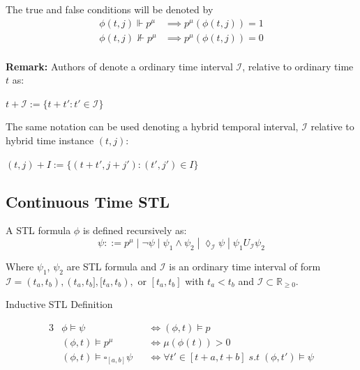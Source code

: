 \documentclass{article}
\theoremstyle{definition}
\begin{document}
\clearpage

The true and false conditions
will be denoted by
\begin{align*}
  \phi(t,j) \Vdash p^\mu &\implies p^\mu(\phi(t,j)) = 1\\
  \phi(t,j) \nVdash p^\mu &\implies p^\mu(\phi(t,j)) = 0\\
\end{align*}



\begin{flushleft}
\textbf{Remark:}
Authors of \cite{hutchison_robust_2010} denote a ordinary time interval $\mathcal{I}$, relative to ordinary time $t$ as: 
\end{flushleft}

\begin{center}
$t + \mathcal{I} := \{t+t': t' \in \mathcal{I}\}$ 
\end{center}
The same notation can be used denoting a hybrid temporal interval, $\mathcal{I}$ relative to hybrid time instance $(t,j)$:
\begin{center}
    $(t,j) + I := \{(t+t',j+j'): (t',j') \in I\}$
\end{center}


\clearpage
\subsection{Continuous Time STL}
A STL formula $\phi$ is defined recursively as:
\begin{equation}
    \psi ::= p^\mu\;|\;\lnot \psi\;|\;\psi_1 \land \psi_2\;|\;\lozenge_{\mathcal{I}} \psi\;|\;\psi_1 U_{\mathcal{I}} \psi_2
\end{equation}


Where $\psi_1$, $\psi_2$ are STL formula and $\mathcal{I}$ is an ordinary time interval of form $\mathcal{I} = (t_a,t_b),(t_a,t_b],[t_a,t_b),$ or $[t_a,t_b]$ with $t_a < t_b$ and $\mathcal{I} \subset \mathbb{R}_{\geq 0}$.

\begin{center}
    Inductive STL Definition
\end{center}
\begin{alignat*}{3}
            &\phi \models \psi &&\Leftrightarrow (\phi, t) \models p \\
            &(\phi, t) \models p^\mu \quad &&\Leftrightarrow \mu(\phi(t))
> 0\\
            &(\phi, t) \models \square_{[a,b]} \psi &&\Leftrightarrow
\forall t' \in [t + a, t + b]\;s.t\;(\phi, t') \models \psi
\end{alignat*}
\end{document}
